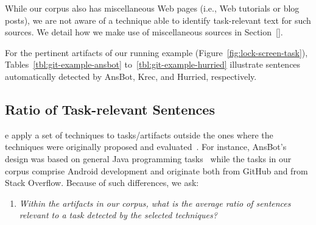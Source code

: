 While our corpus also has miscellaneous Web pages (i.e., Web tutorials or blog posts), we are not aware of a technique able to identify task-relevant text for such sources. We detail how we make use of miscellaneous sources in Section~\ref{}.




For the pertinent artifacts of our running example (Figure~\ref{fig:lock-screen-task}), 
Tables~\ref{tbl:git-example-ansbot} to~\ref{tbl:git-example-hurried}
illustrate sentences automatically detected by \acs{AnsBot}, \acs{Krec}, and \acs{Hurried}, respectively.
 











\subsection{Ratio of Task-relevant Sentences}
\label{cp4:corpus-relevant-text-ratio}


e apply a set of techniques 
to tasks/artifacts outside the ones where the techniques were originally proposed and evaluated~\cite{nadi2020, Robillard2015, Lotufo2012, Xu2017}.
For instance, \acs{AnsBot}'s design was based on general Java programming tasks~\cite{Xu2017} while the tasks in our corpus comprise Android development and originate both from GitHub and from Stack Overflow. Because of such differences, we ask:


\begin{enumerate}[label={},leftmargin=0.7cm]
\item \textit{Within the artifacts in our corpus, what is the average ratio of sentences relevant to a task detected by the selected techniques?} 

\end{enumerate}



